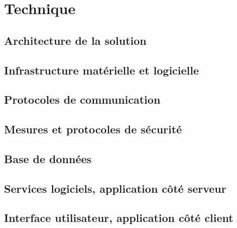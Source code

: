 \section{Technique}

\subsection{Architecture de la solution}

\subsection{Infrastructure matérielle et logicielle}


\subsection{Protocoles de communication}

\subsection{Mesures et protocoles de sécurité}

\subsection{Base de données}

\subsection{Services logiciels, application côté serveur}

\subsection{Interface utilisateur, application côté client}
